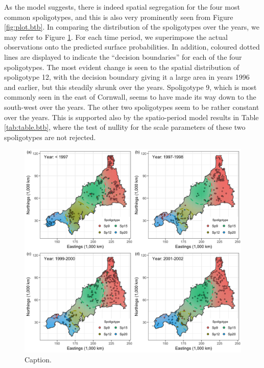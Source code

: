 \documentclass[a4paper,showframe,11pt]{report}\usepackage[]{graphicx}\usepackage[]{color}
\newenvironment{knitrout}{}{} %
\begin{document}
As the model suggests, there is indeed spatial segregation for the four most common spoligotypes, and this is also very prominently seen from Figure \ref{fig:plot.btb}.
In comparing the distribution of the spoligotypes over the years, we may refer to Figure \ref{fig:plot.temporal.btb}.
For each time period, we superimpose the actual observations onto the predicted surface probabilities.
In addition, coloured dotted lines are displayed to indicate the ``decision boundaries'' for each of the four spoligotypes.
The most evident change is seen to the spatial distribution of spoligotype 12, with the decision boundary giving it a large area in years 1996 and earlier, but this steadily shrunk over the years.
Spoligotype 9, which is most commonly seen in the east of Cornwall, seems to have made its way down to the south-west over the years.
The other two spoligotypes seem to be rather constant over the years.
This is supported also by the spatio-period model results in Table \ref{tab:table.btb}, where the test of nullity for the scale parameters of these two spoligotypes are not rejected.

\begin{knitrout}
\color{fgcolor}\begin{figure}[h]

{\centering \includegraphics[width=\linewidth]{figure/plot_temporal_btb-1} 

}

\caption[Caption]{Caption.}\label{fig:plot.temporal.btb}
\end{figure}


\end{knitrout}
\end{document}
